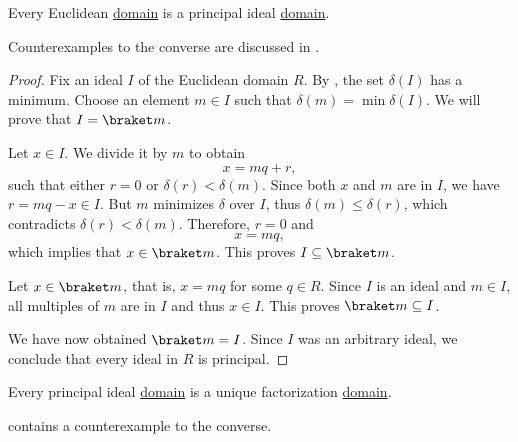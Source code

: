 \begin{proposition}\label{thm:euclidean_domain_is_pid}
  Every Euclidean \hyperref[def:euclidean_domain]{domain} is a principal ideal \hyperref[def:principal_ideal_domain]{domain}.

  Counterexamples to the converse are discussed in \cite{Anderson1988}.
\end{proposition}
\begin{proof}
  Fix an ideal \( I \) of the Euclidean domain \( R \). By , the set \( \delta(I) \) has a minimum. Choose an element \( m \in I \) such that \( \delta(m) = \min \delta(I) \). We will prove that \( I = \braket m \).

  Let \( x \in I \). We divide it by \( m \) to obtain
  \begin{equation*}
    x = mq + r,
  \end{equation*}
  such that either \( r = 0 \) or \( \delta(r) < \delta(m) \). Since both \( x \) and \( m \) are in \( I \), we have \( r = mq - x \in I \). But \( m \) minimizes \( \delta \) over \( I \), thus \( \delta(m) \leq \delta(r) \), which contradicts \( \delta(r) < \delta(m) \). Therefore, \( r = 0 \) and
  \begin{equation*}
    x = mq,
  \end{equation*}
  which implies that \( x \in \braket m \). This proves \( I \subseteq \braket m \).

  Let \( x \in \braket m \), that is, \( x = mq \) for some \( q \in R \). Since \( I \) is an ideal and \( m \in I \), all multiples of \( m \) are in \( I \) and thus \( x \in I \). This proves \( \braket m \subseteq I \).

  We have now obtained \( \braket m = I \). Since \( I \) was an arbitrary ideal, we conclude that every ideal in \( R \) is principal.
\end{proof}

\begin{proposition}\label{thm:pid_is_ufd}
  Every principal ideal \hyperref[def:principal_ideal_domain]{domain} is a unique factorization \hyperref[def:unique_factorization_domain]{domain}.

   contains a counterexample to the converse.
\end{proposition}

